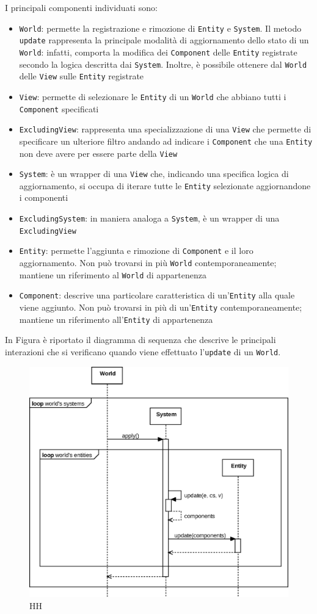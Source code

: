 I principali componenti individuati sono:
\begin{itemize}
    \item \texttt{World}: permette la registrazione e rimozione di \texttt{Entity} e \texttt{System}.
    Il metodo \texttt{update} rappresenta la principale modalità di aggiornamento dello stato di un \texttt{World}: infatti, comporta la modifica dei \texttt{Component} delle \texttt{Entity} registrate secondo la logica descritta dai \texttt{System}.
    Inoltre, è possibile ottenere dal \texttt{World} delle \texttt{View} sulle \texttt{Entity} registrate
    \item \texttt{View}: permette di selezionare le \texttt{Entity} di un \texttt{World} che abbiano tutti i \texttt{Component} specificati
    \item \texttt{ExcludingView}: rappresenta una specializzazione di una \texttt{View} che permette di specificare un ulteriore filtro andando ad indicare i \texttt{Component} che una \texttt{Entity} non deve avere per essere parte della \texttt{View}
    \item \texttt{System}: è un wrapper di una \texttt{View} che, indicando una specifica logica di aggiornamento, si occupa di iterare tutte le \texttt{Entity} selezionate aggiornandone i componenti
    \item \texttt{ExcludingSystem}: in maniera analoga a \texttt{System}, è un wrapper di una \texttt{ExcludingView}
    \item \texttt{Entity}: permette l'aggiunta e rimozione di \texttt{Component} e il loro aggiornamento.
    Non può trovarsi in più \texttt{World} contemporaneamente;
    mantiene un riferimento al \texttt{World} di appartenenza
    \item \texttt{Component}: descrive una particolare caratteristica di un'\texttt{Entity} alla quale viene aggiunto.
    Non può trovarsi in più di un'\texttt{Entity} contemporaneamente;
    mantiene un riferimento all'\texttt{Entity} di appartenenza
\end{itemize}

In Figura è riportato il diagramma di sequenza che descrive le principali interazioni che si verificano quando viene effettuato l'\texttt{update} di un \texttt{World}.

\begin{figure}[H]
    \centering
    \includegraphics[width=\textwidth]{./img/Sequence}
    \caption{HH}\label{fig:figure}
\end{figure}

